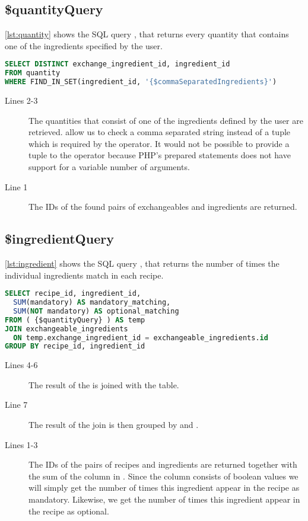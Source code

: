 \subsection*{\$quantityQuery}
\autoref{lst:quantity} shows the SQL query , that returns every quantity that contains one of the ingredients specified by the user.
\begin{lstlisting}[language=SQL, float=h, label={lst:quantity}, caption={\$quantityQuery, return quantities that match the search.}]
SELECT DISTINCT exchange_ingredient_id, ingredient_id
FROM quantity
WHERE FIND_IN_SET(ingredient_id, '{$commaSeparatedIngredients}')
\end{lstlisting}
\begin{description}
\item[Lines 2-3] The quantities that consist of one of the ingredients defined by the user are retrieved.  allow us to check a comma separated string instead of a tuple which is required by the  operator. It would not be possible to provide a tuple to the  operator because PHP's prepared statements does not have support for a variable number of arguments.
\item[Line 1] The IDs of the found pairs of exchangeables and ingredients are returned.
\end{description}



\subsection*{\$ingredientQuery}
\autoref{lst:ingredient} shows the SQL query , that returns the number of times the individual ingredients match in each recipe.
\begin{lstlisting}[language=SQL, float=h, label={lst:ingredient}, caption={\$ingredientQuery, returns the number of times the individual ingredients appear in each recipe.}]
SELECT recipe_id, ingredient_id,
  SUM(mandatory) AS mandatory_matching,
  SUM(NOT mandatory) AS optional_matching
FROM ( {$quantityQuery} ) AS temp
JOIN exchangeable_ingredients
  ON temp.exchange_ingredient_id = exchangeable_ingredients.id
GROUP BY recipe_id, ingredient_id
\end{lstlisting}
\begin{description}
\item[Lines 4-6] The result of the  is joined with the \linebreak{} table.
\item[Line 7] The result of the join is then grouped by  and .
\item[Lines 1-3] The IDs of the pairs of recipes and ingredients are returned together with the sum of the  column in . Since the  column consists of boolean values we will simply get the number of times this ingredient appear in the recipe as mandatory. Likewise, we get the number of times this ingredient appear in the recipe as optional.
\end{description}



